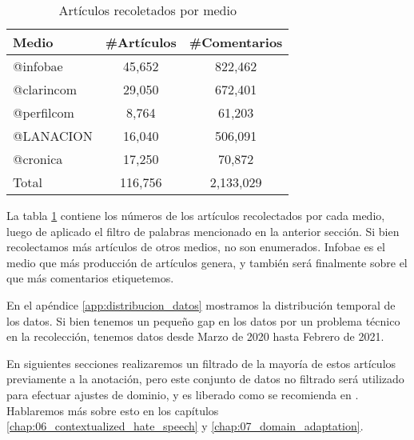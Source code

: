 \begin{table}[t]
    \centering
    \begin{tabular}{l|c|c}
    Medio      & \#Artículos & \#Comentarios \\
    \hline
    @infobae   &  45,652   &  822,462 \\
    @clarincom &  29,050   &  672,401 \\
    @perfilcom &  8,764    &  61,203  \\
    @LANACION  &  16,040   &  506,091 \\
    @cronica   &  17,250   &  70,872 \\
    \hline
    Total      & 116,756  & 2,133,029 \\
    \end{tabular}
    \caption{Artículos recoletados por medio}
    \label{tab:articulos_recoletados_por_medio}
\end{table}


La tabla \ref{tab:articulos_recoletados_por_medio} contiene los números de los artículos recolectados por cada medio, luego de aplicado el filtro de palabras mencionado en la anterior sección. Si bien recolectamos más artículos de otros medios, no son enumerados. Infobae es el medio que más producción de artículos genera, y también será finalmente sobre el que más comentarios etiquetemos.

En el apéndice \ref{app:distribucion_datos} mostramos la distribución temporal de los datos. Si bien tenemos un pequeño gap en los datos por un problema técnico en la recolección, tenemos datos desde Marzo de 2020 hasta Febrero de 2021.

En siguientes secciones realizaremos un filtrado de la mayoría de estos artículos previamente a la anotación, pero este conjunto de datos no filtrado será utilizado para efectuar ajustes de dominio, y es liberado como se recomienda en \citet{gururangan-etal-2020-dont}. Hablaremos más sobre esto en los capítulos \ref{chap:06_contextualized_hate_speech} y \ref{chap:07_domain_adaptation}.

